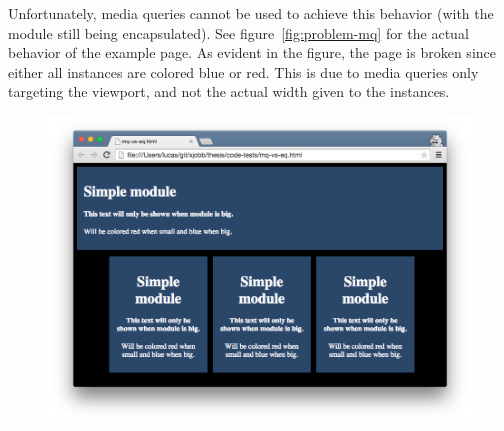 \documentclass[a4paper,11pt]{kth-mag}
\begin{document}
        Unfortunately, \gls{media queries} cannot be used to achieve this behavior (with the module still being \gls{encapsulated}).
        See figure~\ref{fig:problem-mq} for the actual behavior of the example page.
        As evident in the figure, the page is broken since either all instances are colored blue or red.
        This is due to \gls{media queries} only targeting the \gls{viewport}, and not the actual width given to the instances.
        \begin{figure}[ht]
          \centering
          \begin{minipage}{.5\textwidth}
            \centering
            \includegraphics[width=\linewidth]{images/mq-big}
          \end{minipage}%
          \begin{minipage}{.5\textwidth}
            \centering

\end{minipage}
\end{figure}
\end{document}
